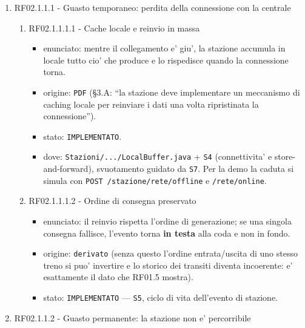 \documentclass[11pt]{article}
\begin{document}
\begin{enumerate}
\item RF02.1.1.1 - Guasto temporaneo: perdita della connessione con la centrale
\label{sec:org217d1a9}

\begin{enumerate}
\item RF02.1.1.1.1 - Cache locale e reinvio in massa
\label{sec:org6a58afd}
\begin{itemize}
\item enunciato: mentre il collegamento e' giu', la stazione accumula in locale tutto cio' che produce
e lo rispedisce quando la connessione torna.
\item origine: \texttt{PDF} (§3.A: ``la stazione deve implementare un meccanismo di caching locale per
reinviare i dati una volta ripristinata la connessione'').
\item stato: \texttt{IMPLEMENTATO}.
\item dove: \texttt{Stazioni/.../LocalBuffer.java} + \texttt{S4} (connettivita' e store-and-forward), svuotamento
guidato da \texttt{S7}. Per la demo la caduta si simula con \texttt{POST /stazione/rete/offline} e
\texttt{/rete/online}.
\end{itemize}
\item RF02.1.1.1.2 - Ordine di consegna preservato
\label{sec:orge4fc913}
\begin{itemize}
\item enunciato: il reinvio rispetta l'ordine di generazione; se una singola consegna fallisce,
l'evento torna \textbf{in testa} alla coda e non in fondo.
\item origine: \texttt{derivato} (senza questo l'ordine entrata/uscita di uno stesso treno si puo' invertire e
lo storico dei transiti diventa incoerente: e' esattamente il dato che RF01.5 mostra).
\item stato: \texttt{IMPLEMENTATO} — \texttt{S5}, ciclo di vita dell'evento di stazione.
\end{itemize}
\end{enumerate}
\item RF02.1.1.2 - Guasto permanente: la stazione non e' percorribile
\label{sec:org67904bf}


\end{enumerate}
\end{document}
